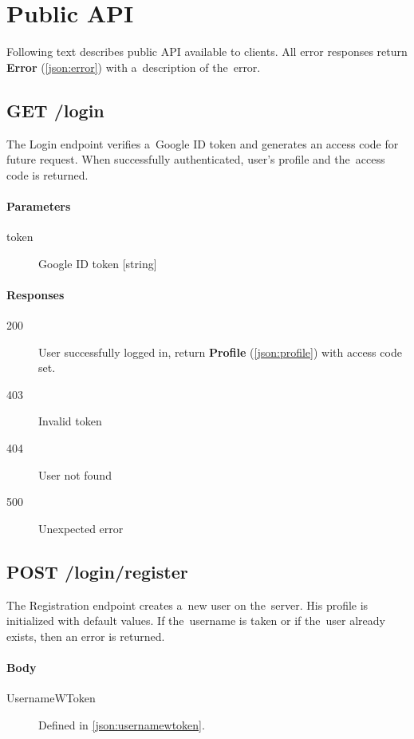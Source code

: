 \section{Public API}
Following text describes public API available to clients. All error responses return \textbf{Error} (\ref{json:error}) with a~description of the~error.

	\subsection{GET /login}
	The Login endpoint verifies a~Google ID token and generates an access code for future request. When successfully authenticated, user's profile and the~access code is returned.
		\paragraph*{Parameters}
			\begin{description}
				\item[token] Google ID token [string]
			\end{description}
		\paragraph*{Responses}
			\begin{description}
				\item[200] User successfully logged in, return \textbf{Profile} (\ref{json:profile}) with access code set.
				\item[403] Invalid token
				\item[404] User not found
				\item[500] Unexpected error
			\end{description}
	
	\subsection{POST /login/register}
	The Registration endpoint creates a~new user on the~server. His profile is initialized with default values. If the~username is taken or if the~user already exists, then an error is returned.
	
		\paragraph*{Body}
			\begin{description}
				\item[UsernameWToken] Defined in \ref{json:usernamewtoken}.
			\end{description}
